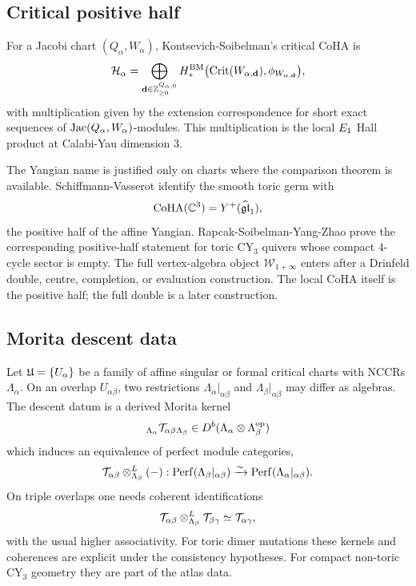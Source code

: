 \subsection*{Critical positive half}

For a Jacobi chart \((Q_\alpha,W_\alpha)\), Kontsevich-Soibelman's
critical CoHA is
\[
  \mathcal H_\alpha
  =
  \bigoplus_{\mathbf d\in\mathbb Z^{Q_{\alpha,0}}_{\geq0}}
  H^{\mathrm{BM}}_*
  \bigl(\mathrm{Crit}(W_{\alpha,\mathbf d}),\phi_{W_{\alpha,\mathbf d}}\bigr),
\]
with multiplication given by the extension correspondence for short
exact sequences of \(\mathrm{Jac}(Q_\alpha,W_\alpha)\)-modules.  This
multiplication is the local \(E_{1}\) Hall product at Calabi-Yau
dimension \(3\).

The Yangian name is justified only on charts where the comparison
theorem is available.  Schiffmann-Vasserot identify the smooth toric
germ with
\[
  \mathrm{CoHA}(\mathbb C^3)=Y^{+}(\widehat{\mathfrak{gl}}_1),
\]
the positive half of the affine Yangian.  Rapcak-Soibelman-Yang-Zhao
prove the corresponding positive-half statement for toric CY$_3$
quivers whose compact \(4\)-cycle sector is empty.  The full
vertex-algebra object \(\mathcal W_{1+\infty}\) enters after a
Drinfeld double, centre, completion, or evaluation construction.  The
local CoHA itself is the positive half; the full double is a later
construction.

\subsection*{Morita descent data}

Let \(\mathfrak U=\{U_\alpha\}\) be a family of affine singular or formal
critical charts with NCCRs \(\Lambda_\alpha\).  On an overlap
\(U_{\alpha\beta}\), two restrictions
\(\Lambda_\alpha|_{\alpha\beta}\) and
\(\Lambda_\beta|_{\alpha\beta}\) may differ as algebras.
The descent datum is a derived Morita kernel
\[
  {}_{\Lambda_\alpha}\mathcal T_{\alpha\beta}{}_{\Lambda_\beta}
  \in
  D^{b}(\Lambda_\alpha\otimes\Lambda_\beta^{\mathrm{op}})
\]
which induces an equivalence of perfect module categories,
\[
  \mathcal T_{\alpha\beta}\otimes^L_{\Lambda_\beta}(-)
  :
  \mathrm{Perf}(\Lambda_\beta|_{\alpha\beta})
  \xrightarrow{\sim}
  \mathrm{Perf}(\Lambda_\alpha|_{\alpha\beta}).
\]
On triple overlaps one needs coherent identifications
\[
  \mathcal T_{\alpha\beta}\otimes^L_{\Lambda_\beta}\mathcal T_{\beta\gamma}
  \simeq
  \mathcal T_{\alpha\gamma},
\]
with the usual higher associativity.  For toric dimer mutations these
kernels and coherences are explicit under the consistency hypotheses.
For compact non-toric CY$_3$ geometry they are part of the atlas data.

